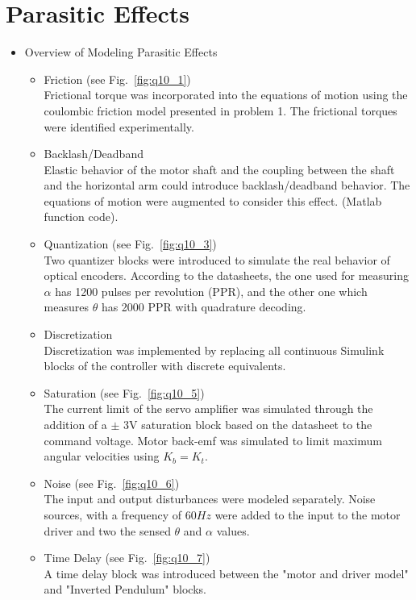 \documentclass{article}
\theoremstyle{plain}
\theoremstyle{definition}
\theoremstyle{remark}
\begin{document}
\clearpage
\section{Parasitic Effects}
\begin{itemize}
\item Overview of Modeling Parasitic Effects
\begin{itemize}
\item Friction (see Fig.~\ref{fig:q10_1})\\
Frictional torque was incorporated into the equations of motion using the coulombic friction model presented in problem 1.  The frictional torques were identified experimentally.
\item Backlash/Deadband\\
Elastic behavior of the motor shaft and the coupling between the shaft and the horizontal arm could introduce backlash/deadband behavior.  The equations of motion were augmented to consider this effect. (Matlab function code).  
\item Quantization (see Fig.~\ref{fig:q10_3})\\
Two quantizer blocks were introduced to simulate the real behavior of optical encoders. According to the datasheets, the one used for measuring $\alpha$ has 1200 pulses per revolution (PPR), and the other one which measures $\theta$ has 2000 PPR with quadrature decoding.  
\item Discretization\\
Discretization was implemented by replacing all continuous Simulink blocks of the controller with discrete equivalents.  
\item Saturation (see Fig.~\ref{fig:q10_5})\\
The current limit of the servo amplifier was simulated through the addition of a $\pm$ 3V saturation block based on the datasheet to the command voltage.  Motor back-emf was simulated to limit maximum angular velocities using $K_b = K_t$.  
\item Noise (see Fig.~\ref{fig:q10_6})\\
The input and output disturbances were modeled separately. Noise sources, with a frequency of $60 Hz$ were added to the input to the motor driver and two the sensed $\theta$ and $\alpha$ values.  
\item Time Delay (see Fig.~\ref{fig:q10_7})\\
A time delay block was introduced between the "motor and driver model" and "Inverted Pendulum" blocks.    
\end{itemize}


\end{itemize}
\end{document}
